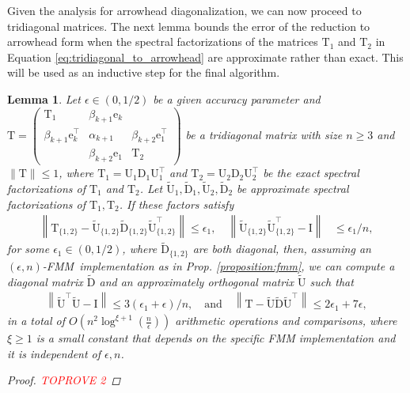 \documentclass{article}
\newcommand{\lnorm}{\left\|}
\newcommand{\rnorm}{\right\|}
\newcommand{\lpar}{\left(}
\newcommand{\rpar}{\right)}
\newtheorem{lemma}{Lemma}[section]
\newcommand\vece{\boldsymbol{\mathrm{e}}}
\newcommand\matD{\boldsymbol{\mathrm{D}}}
\newcommand\matI{\boldsymbol{\mathrm{I}}}
\newcommand\matT{\boldsymbol{\mathrm{T}}}
\newcommand\matU{\boldsymbol{\mathrm{U}}}
\newcommand\matDtilde{\widetilde{\boldsymbol{\mathrm{D}}}}
\newcommand\matUtilde{\widetilde{\boldsymbol{\mathrm{U}}}}
\newcommand{\cfmm}{\xi}
\newcommand{\fmmalgo}{FMM} \usepackage[utf8]{inputenc}
\begin{document}
Given the analysis for arrowhead diagonalization, we can now proceed to tridiagonal matrices.
The next lemma bounds the error of the reduction to arrowhead form when the spectral factorizations of the matrices $\matT_1$ and $\matT_2$ in Equation \eqref{eq:tridiagonal_to_arrowhead} are approximate rather than exact. This will be used as an inductive step for the final algorithm.
\begin{lemma}
\label{lemma:tridiagonal_assembly}
Let $\epsilon\in(0,1/2)$ be a given accuracy parameter and $\matT = \begin{pmatrix}
    \matT_1 & \beta_{k+1}\vece_k & \\
    \beta_{k+1}\vece_k^\top & \alpha_{k+1} & \beta_{k+2}\vece_1^\top \\
     & \beta_{k+2}\vece_1 & \matT_2
\end{pmatrix}$ be a tridiagonal matrix with size  $n\geq 3$ and $\|\matT\|\leq 1$, where $\matT_1=\matU_1\matD_1\matU_1^\top$ and $\matT_2=\matU_2\matD_2\matU_2^\top$ be the exact spectral factorizations of $\matT_1$ and $\matT_2$. Let $\matUtilde_1,\matDtilde_1,\matUtilde_2,\matDtilde_2$ be approximate spectral factorizations of $\matT_1,\matT_2$. If these factors satisfy
    \begin{align*}
        \lnorm
            \matT_{\{1,2\}} - \matUtilde_{\{1,2\}}\matDtilde_{\{1,2\}}\matUtilde_{\{1,2\}}^\top
        \rnorm 
        \leq \epsilon_1,
        \quad
        \lnorm \matUtilde_{\{1,2\}}\matUtilde_{\{1,2\}}^\top -\matI \rnorm &\leq \epsilon_1/n,
    \end{align*}
    for some $\epsilon_1\in(0,1/2)$, where $\matDtilde_{\{1,2\}}$ are both diagonal, then, assuming an $(\epsilon,n)$-\fmmalgo\   implementation as in Prop. \ref{proposition:fmm}, we can compute a diagonal matrix $\matDtilde$ and an approximately orthogonal matrix $\matUtilde$ such that
    \begin{align*}
        \lnorm\matUtilde^\top\matUtilde-\matI\rnorm\leq 3(\epsilon_1+\epsilon)/n,
        \quad \text{and} \quad
        \lnorm 
            \matT-\matUtilde\matDtilde\matUtilde^\top
        \rnorm \leq 2\epsilon_1+7\epsilon,
    \end{align*}
    in a total of $O\lpar n^2\log^{\cfmm+1}(\tfrac{n}{\epsilon})\rpar$ arithmetic operations and comparisons, where $\xi\geq 1$ is a small constant that depends on the specific FMM implementation and it is independent of $\epsilon,n$.
    \begin{proof}\textcolor{red}{TOPROVE 2}\end{proof}
\end{lemma}
\end{document}
